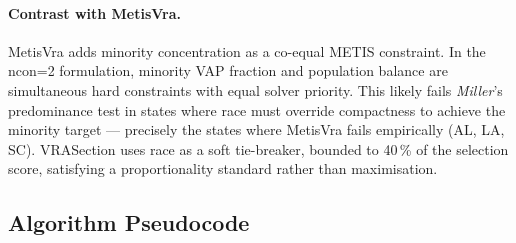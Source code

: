 \paragraph{Contrast with MetisVra.}
MetisVra adds minority concentration as a co-equal METIS constraint.
In the ncon=2 formulation, minority VAP fraction and population balance
are simultaneous hard constraints with equal solver priority.
This likely fails \emph{Miller}'s predominance test in states where race
must override compactness to achieve the minority target --- precisely
the states where MetisVra fails empirically (AL, LA, SC).
VRASection uses race as a soft tie-breaker, bounded to 40\,\% of the
selection score, satisfying a proportionality standard rather than maximisation.

\subsection{Algorithm Pseudocode}

